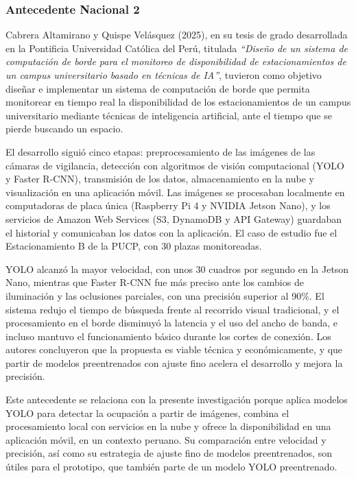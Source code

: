\documentclass[12pt,a4paper]{article}
\begin{document}
\subsubsection{Antecedente Nacional 2}

Cabrera Altamirano y Quispe Velásquez (2025), en su tesis de grado desarrollada en la Pontificia Universidad Católica del Perú, titulada \textit{``Diseño de un sistema de computación de borde para el monitoreo de disponibilidad de estacionamientos de un campus universitario basado en técnicas de IA''}, tuvieron como objetivo diseñar e implementar un sistema de computación de borde que permita monitorear en tiempo real la disponibilidad de los estacionamientos de un campus universitario mediante técnicas de inteligencia artificial, ante el tiempo que se pierde buscando un espacio.

El desarrollo siguió cinco etapas: preprocesamiento de las imágenes de las cámaras de vigilancia, detección con algoritmos de visión computacional (YOLO y Faster R-CNN), transmisión de los datos, almacenamiento en la nube y visualización en una aplicación móvil. Las imágenes se procesaban localmente en computadoras de placa única (Raspberry Pi 4 y NVIDIA Jetson Nano), y los servicios de Amazon Web Services (S3, DynamoDB y API Gateway) guardaban el historial y comunicaban los datos con la aplicación. El caso de estudio fue el Estacionamiento B de la PUCP, con 30 plazas monitoreadas.

YOLO alcanzó la mayor velocidad, con unos 30 cuadros por segundo en la Jetson Nano, mientras que Faster R-CNN fue más preciso ante los cambios de iluminación y las oclusiones parciales, con una precisión superior al 90\%. El sistema redujo el tiempo de búsqueda frente al recorrido visual tradicional, y el procesamiento en el borde disminuyó la latencia y el uso del ancho de banda, e incluso mantuvo el funcionamiento básico durante los cortes de conexión. Los autores concluyeron que la propuesta es viable técnica y económicamente, y que partir de modelos preentrenados con ajuste fino acelera el desarrollo y mejora la precisión.

Este antecedente se relaciona con la presente investigación porque aplica modelos YOLO para detectar la ocupación a partir de imágenes, combina el procesamiento local con servicios en la nube y ofrece la disponibilidad en una aplicación móvil, en un contexto peruano. Su comparación entre velocidad y precisión, así como su estrategia de ajuste fino de modelos preentrenados, son útiles para el prototipo, que también parte de un modelo YOLO preentrenado.
\end{document}

